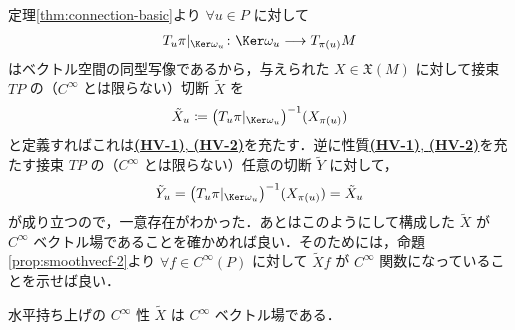 \documentclass[geometry_main]{subfiles}
\begin{document}
定理\ref{thm:connection-basic}より $\forall u \in P$ に対して
\begin{align}
    T_u \pi|_{\Ker \omega_u} \colon \Ker \omega_u \lto T_{\pi(u)} M
\end{align}
はベクトル空間の同型写像であるから，与えられた $X \in \mathfrak{X} (M)$ に対して接束 $TP$ の（$C^\infty$ とは限らない）切断 $\tilde{X}$ を
\begin{align}
    \tilde{X}_u \coloneqq \bigl( T_u \pi|_{\Ker \omega_u} \bigr)^{-1} (X_{\pi(u)})
\end{align}
と定義すればこれは\hyperref[def:horizontal-lift-vecf]{\textbf{\textsf{(HV-1)}}, \textsf{\textbf{(HV-2)}}}を充たす．逆に性質\hyperref[def:horizontal-lift-vecf]{\textbf{\textsf{(HV-1)}}, \textsf{\textbf{(HV-2)}}}を充たす接束 $TP$ の（$C^\infty$ とは限らない）任意の切断 $\tilde{Y}$ に対して，
\begin{align}
    \tilde{Y}_u = \bigl( T_u \pi|_{\Ker \omega_u} \bigr)^{-1} (X_{\pi(u)}) = \tilde{X}_u
\end{align}
が成り立つので，一意存在がわかった．あとはこのようにして構成した $\tilde{X}$ が $C^\infty$ ベクトル場であることを確かめれば良い．そのためには，命題\ref{prop:smoothvecf-2}より $\forall f \in C^\infty(P)$ に対して $\tilde{X} f$ が $C^\infty$ 関数になっていることを示せば良い．

\begin{myprop}[]{水平持ち上げの $C^\infty$ 性}
    $\tilde{X}$ は $C^\infty$ ベクトル場である．
\end{myprop}
\end{document}
